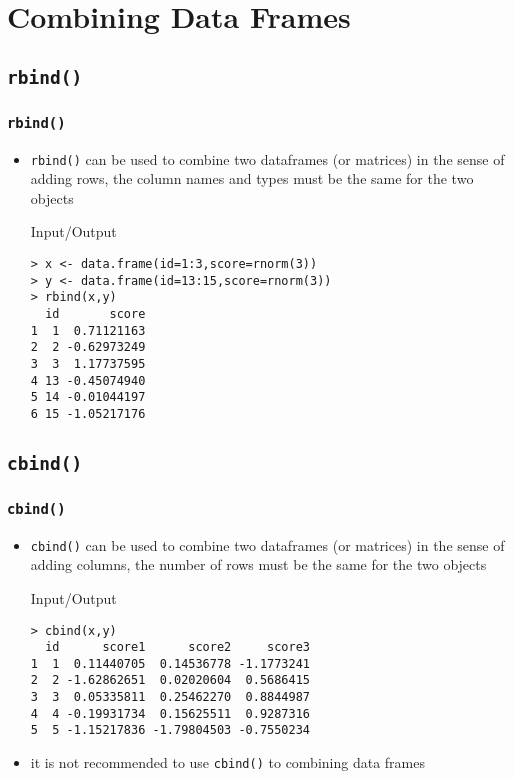 \section{Combining Data Frames}
\subsection{\texttt{rbind()}}
\begin{frame}[fragile]\frametitle{\texttt{rbind()}}
\begin{itemize}
\item \texttt{rbind()} can be used to combine two dataframes (or matrices) in the sense of adding rows, the column names and types must be the same for the two objects
  \begin{exampleblock}{Input/Output}\small
\begin{verbatim}
> x <- data.frame(id=1:3,score=rnorm(3))
> y <- data.frame(id=13:15,score=rnorm(3))
> rbind(x,y)
  id       score
1  1  0.71121163
2  2 -0.62973249
3  3  1.17737595
4 13 -0.45074940
5 14 -0.01044197
6 15 -1.05217176
\end{verbatim}
  \end{exampleblock}
\end{itemize}
\end{frame}

\subsection{\texttt{cbind()}}
\begin{frame}[fragile]\frametitle{\texttt{cbind()}}
\begin{itemize}
\item \texttt{cbind()} can be used to combine two dataframes (or matrices) in the sense of adding columns, the number of rows must be the same for the two objects
  \begin{exampleblock}{Input/Output}\small
\begin{verbatim}
> cbind(x,y)
  id      score1      score2     score3
1  1  0.11440705  0.14536778 -1.1773241
2  2 -1.62862651  0.02020604  0.5686415
3  3  0.05335811  0.25462270  0.8844987
4  4 -0.19931734  0.15625511  0.9287316
5  5 -1.15217836 -1.79804503 -0.7550234
\end{verbatim}
  \end{exampleblock}
\item it is not recommended to use \texttt{cbind()} to combining data frames
\end{itemize}
\end{frame}


